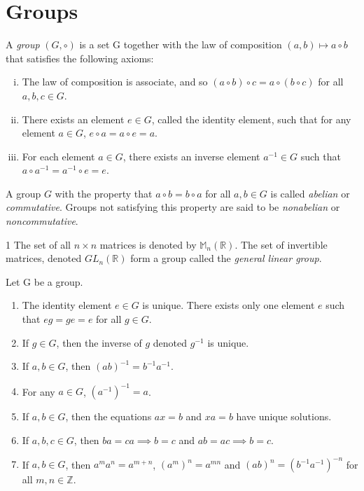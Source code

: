 \section{Groups}

\begin{defn}{1}
	A \textit{group} $(G,\circ)$ is a set G together with the law of composition $(a,b)\mapsto a \circ b$ that satisfies the following axioms:
	\begin{enumerate}[(i)]
		\item The law of composition is associate, and so $(a \circ b) \circ c = a \circ (b \circ c)$ for all $a,b,c \in G$.
		\item There exists an element $e \in G$, called the identity element, such that for any element $a \in G$, $e \circ a = a \circ e = a$.
		\item For each element $a \in G$, there exists an inverse element $a^{-1}\in G$ such that $a \circ a^{-1} = a^{-1} \circ e = e$. 
	\end{enumerate}
\end{defn}

\begin{defn}{1}
	A group $G$ with the property that $a \circ b = b \circ a$ for all $a,b \in G$ is called \textit{abelian} or	\textit{commutative}. Groups not satisfying this property are said to be \textit{nonabelian} or \textit{noncommutative}.
\end{defn}

\begin{defn}{1}
	The set of all $n \times n$ matrices is denoted by $\mathbb{M}_n(\mathbb{R})$. The set of invertible matrices, denoted $GL_n(\mathbb{R})$ form a group called the \textit{general linear group}. 
\end{defn}

\begin{theo}{1}
	Let G be a group.
	\begin{enumerate}
		\item The identity element $e\in G$ is unique. There exists only one element $e$ such that $eg=ge=e$ for all $g\in G$.
		\item If $g\in G$, then the inverse of $g$ denoted $g^{-1}$ is unique.
		\item If $a,b\in G$, then $(ab)^{-1} = b^{-1}a^{-1}$. 
		\item For any $a \in G$, $(a^{-1})^{-1}=a$.
		\item If $a,b \in G$, then the equations $ax=b$ and $xa=b$ have unique solutions.
		\item If $a,b,c \in G$, then $ba=ca \implies b=c$ and $ab=ac \implies b=c$.
		\item If $a,b \in G$, then $a^ma^n=a^{m+n}$, $(a^m)^n = a^{mn}$ and $(ab)^n = (b^{-1}a^{-1})^{-n}$ for all $m,n \in \mathbb{Z}$.
	\end{enumerate}
\end{theo}

